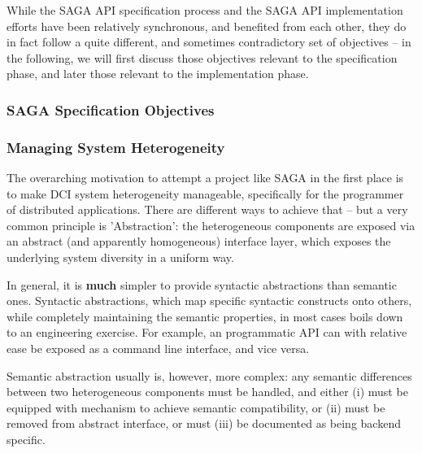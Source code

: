 \documentclass[a4paper,12pt]{article}
\newcommand{\B}[1]{\textbf{#1}}
\begin{document}
  While the SAGA API specification process and the SAGA API
  implementation efforts have been relatively synchronous, and
  benefited from each other, they do in fact follow a quite different,
  and sometimes contradictory set of objectives -- in the following,
  we will first discuss those objectives relevant to the specification
  phase, and later those relevant to the implementation phase.

  \subsubsection{SAGA Specification Objectives}
  \label{sec:designobjectives.spec}

   \subsubsection*{Managing System Heterogeneity}


    The overarching motivation to attempt a project like SAGA in the
    first place is to make DCI system heterogeneity manageable,
    specifically for the programmer of distributed applications.
    There are different ways to achieve that -- but a very common
    principle is 'Abstraction': the heterogeneous components are
    exposed via an abstract (and apparently homogeneous) interface
    layer, which exposes the underlying system diversity in a uniform
    way.

    In general, it is \B{much} simpler to provide syntactic
    abstractions than semantic ones.  Syntactic abstractions, which
    map specific syntactic constructs onto others, while completely
    maintaining the semantic properties, in most cases boils down to
    an engineering exercise.  For example, an programmatic API can
    with relative ease be exposed as a command line interface, and
    vice versa.

    Semantic abstraction usually is, however, more complex: any
    semantic differences between two heterogeneous components must be
    handled, and either (i) must be equipped with mechanism to achieve
    semantic compatibility, or (ii) must be removed from abstract
    interface, or must (iii) be documented as being backend specific.
\end{document}
